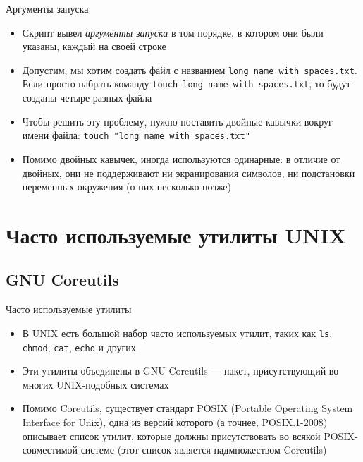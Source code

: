 \documentclass[handout]{beamer}
\begin{document}
\begin{frame}{Аргументы запуска}
	\begin{itemize}
		\item{Скрипт вывел \emph{аргументы запуска} в том порядке, в котором они были указаны, каждый на своей строке}\pause
		\item{Допустим, мы хотим создать файл с названием \texttt{long name with spaces.txt}. Если просто набрать команду \texttt{touch~long~name~with~spaces.txt}, то будут созданы четыре разных файла}\pause
		\item{Чтобы решить эту проблему, нужно поставить двойные кавычки вокруг имени файла: \texttt{touch~"long~name~with~spaces.txt"}}\pause
		\item{Помимо двойных кавычек, иногда используются одинарные: в отличие от двойных, они не поддерживают ни экранирования символов, ни подстановки переменных окружения (о них несколько позже)} 
	\end{itemize}
\end{frame}

\section{Часто используемые утилиты UNIX}

\subsection{GNU Coreutils}
\begin{frame}{Часто используемые утилиты}
	\begin{itemize}
		\item{В UNIX есть большой набор часто используемых утилит, таких как \texttt{ls}, \texttt{chmod}, \texttt{cat}, \texttt{echo} и других}\pause
		\item{Эти утилиты объединены в GNU Coreutils --- пакет, присутствующий во многих UNIX-подобных системах}\pause
		\item{Помимо Coreutils, существует стандарт POSIX (Portable Operating System Interface for Unix), одна из версий которого (а точнее, POSIX.1-2008) описывает список утилит, которые должны присутствовать во всякой POSIX-совместимой системе (этот список является надмножеством Coreutils)}
	\end{itemize}
\end{frame}
\end{document}

